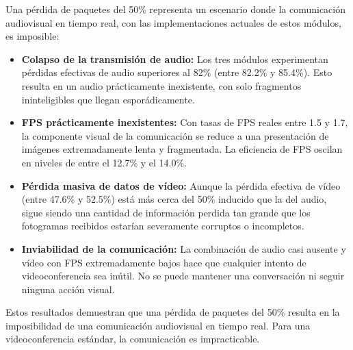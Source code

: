 Una pérdida de paquetes del 50\% representa un escenario donde la comunicación audiovisual en tiempo real, con las implementaciones actuales de estos módulos, es imposible:
\vspace{\baselineskip}

\begin{itemize}
\item \textbf{Colapso de la transmisión de audio:} Los tres módulos experimentan pérdidas efectivas de audio superiores al 82\% (entre 82.2\% y 85.4\%). Esto resulta en un audio prácticamente inexistente, con solo fragmentos ininteligibles que llegan esporádicamente.
\item \textbf{FPS prácticamente inexistentes:} Con tasas de FPS reales entre 1.5 y 1.7, la componente visual de la comunicación se reduce a una presentación de imágenes extremadamente lenta y fragmentada. La eficiencia de FPS oscilan en niveles de entre el 12.7\% y el 14.0\%.
\item \textbf{Pérdida masiva de datos de vídeo:} Aunque la pérdida efectiva de vídeo (entre 47.6\% y 52.5\%) está más cerca del 50\% inducido que la del audio, sigue siendo una cantidad de información perdida tan grande que los fotogramas recibidos estarían severamente corruptos o incompletos.
\item \textbf{Inviabilidad de la comunicación:} La combinación de audio casi ausente y vídeo con FPS extremadamente bajos hace que cualquier intento de videoconferencia sea inútil. No se puede mantener una conversación ni seguir ninguna acción visual.
\end{itemize}

Estos resultados demuestran que una pérdida de paquetes del 50\% resulta en la imposibilidad de una comunicación audiovisual en tiempo real. Para una videoconferencia estándar, la comunicación es impracticable.
\newpage

\setlength{\tabcolsep}{3pt} 


